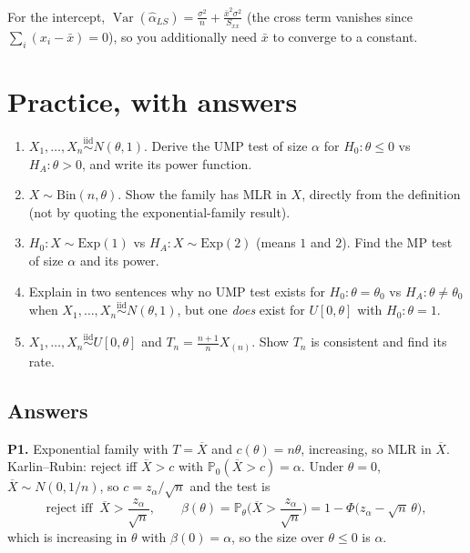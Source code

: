 \documentclass[11pt]{article}
\newcommand{\Var}{\operatorname{Var}}
\newcommand{\Prob}{\mathbb{P}}
\newcommand{\Xbar}{\overline{X}}
\newcommand{\iid}{\overset{\text{iid}}{\sim}}
\begin{document}
For the intercept, $\Var(\hat\alpha_{LS})=\frac{\sigma^2}{n}+\frac{\bar x^2\sigma^2}{S_{xx}}$
(the cross term vanishes since $\sum_i(x_i-\bar x)=0$), so you additionally need $\bar x$ to
converge to a constant.

\section{Practice, with answers}

\begin{enumerate}[label=\textbf{P\arabic*.}]
\item $X_1,\dots,X_n\iid N(\theta,1)$. Derive the UMP test of size $\alpha$ for
$H_0:\theta\le0$ vs $H_A:\theta>0$, and write its power function.

\item $X\sim\mathrm{Bin}(n,\theta)$. Show the family has MLR in $X$, directly from the
definition (not by quoting the exponential-family result).

\item $H_0: X\sim\mathrm{Exp}(1)$ vs $H_A: X\sim\mathrm{Exp}(2)$ (means $1$ and $2$). Find the
MP test of size $\alpha$ and its power.

\item Explain in two sentences why no UMP test exists for $H_0:\theta=\theta_0$ vs
$H_A:\theta\ne\theta_0$ when $X_1,\dots,X_n\iid N(\theta,1)$, but one \emph{does} exist for
$U[0,\theta]$ with $H_0:\theta=1$.

\item $X_1,\dots,X_n\iid U[0,\theta]$ and $T_n=\frac{n+1}{n}X_{(n)}$. Show $T_n$ is consistent
and find its rate.
\end{enumerate}

\subsection*{Answers}

\noindent\textbf{P1.} Exponential family with $T=\Xbar$ and $c(\theta)=n\theta$, increasing, so
MLR in $\Xbar$. Karlin--Rubin: reject iff $\Xbar>c$ with
$\Prob_{0}(\Xbar>c)=\alpha$. Under $\theta=0$, $\Xbar\sim N(0,1/n)$, so
$c=z_\alpha/\sqrt n$ and the test is
\[
\text{reject iff }\ \Xbar>\frac{z_\alpha}{\sqrt n},\qquad
\beta(\theta)=\Prob_\theta\Big(\Xbar>\frac{z_\alpha}{\sqrt n}\Big)
=1-\Phi\big(z_\alpha-\sqrt n\,\theta\big),
\]
which is increasing in $\theta$ with $\beta(0)=\alpha$, so the size over $\theta\le0$ is
$\alpha$. \checkmark
\end{document}
